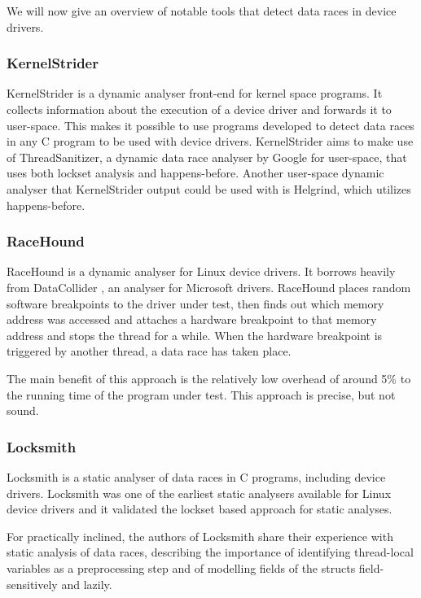 \documentclass[..thesis.tex]{subfiles}
\begin{document}
We will now give an overview of notable tools that detect data races in device drivers.

\subsubsection{KernelStrider}

KernelStrider\cite{shatokhin_kernel} is a dynamic analyser front-end for kernel space programs.
It collects information about the execution of a device driver and forwards it to user-space.
This makes it possible to use programs developed to detect data races in any C program to be used with device drivers.
KernelStrider aims to make use of ThreadSanitizer\cite{serebryany_threadsanitizer_2009}, a dynamic data race analyser by Google for user-space,
that uses both lockset analysis and happens-before. Another user-space dynamic analyser that KernelStrider output could be used with is Helgrind,
\cite{_helgrind,nethercote_valgrind_2007} which utilizes happens-before.

\subsubsection{RaceHound}

RaceHound\cite{komarov_implementation_2013} is a dynamic analyser for Linux device drivers.
It borrows heavily from DataCollider \cite{erickson_effective_2010}, an analyser for Microsoft drivers.
RaceHound places random software breakpoints to the driver under test,
then finds out which memory address was accessed and attaches a hardware breakpoint to that memory address and stops the thread for a while.
When the hardware breakpoint is triggered by another thread, a data race has taken place.

The main benefit of this approach is the relatively low overhead of around 5\% to the running time of the program under test.
This approach is precise, but not sound.

\subsubsection{Locksmith}
Locksmith\cite{pratikakis_locksmith_2006} is a static analyser of data races in C programs, including device drivers.
Locksmith was one of the earliest static analysers available for Linux device drivers and it validated the lockset based approach for static analyses. 

For practically inclined, the authors of Locksmith share their experience with static analysis of data races,
describing the importance of identifying thread-local variables as a preprocessing step and of modelling fields of the structs field-sensitively and lazily\cite{pratikakis_locksmith_2011}.
\end{document}
